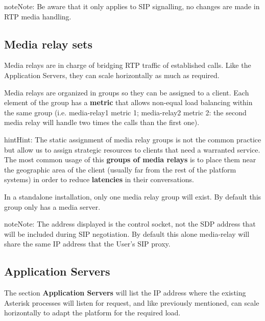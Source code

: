 \documentclass[letterpaper,10pt,english]{sphinxmanual}
\begin{document}
\begin{notice}{note}{Note:}
Be aware that it only applies to SIP signalling, no changes are made in RTP media handling.
\end{notice}


\subsection{Media relay sets}
\label{administration_portal/platform/infrastructure/media_relay_sets::doc}\label{administration_portal/platform/infrastructure/media_relay_sets:media-relay-sets}
Media relays are in charge of bridging RTP traffic of established calls. Like
the Application Servers, they can scale horizontally as much as required.

Media relays are organized in groups so they can be assigned to a client. Each
element of the group has a \textbf{metric} that allows non-equal load balancing
within the same group (i.e. media-relay1 metric 1; media-relay2 metric 2:
the second media relay will handle two times the calls than the first one).

\begin{notice}{hint}{Hint:}
The static assignment of media relay groups is not the common practice
but allow us to assign strategic resources to clients that need a warranted
service. The most common usage of this \textbf{groups of media relays} is to
place them near the geographic area of the client (usually far from the
rest of the platform systems) in order to reduce \textbf{latencies} in their
conversations.
\end{notice}

In a standalone installation, only one media relay group will exist. By default this group only has a media server.

\begin{notice}{note}{Note:}
The address displayed is the control socket, not the SDP address that
will be included during SIP negotiation. By default this alone media-relay
will share the same IP address that the User's SIP proxy.
\end{notice}


\subsection{Application Servers}
\label{administration_portal/platform/infrastructure/application_servers::doc}\label{administration_portal/platform/infrastructure/application_servers:application-servers}
The section \textbf{Application Servers} will list the IP address where the existing
Asterisk processes will listen for request, and like previously mentioned,
can scale horizontally to adapt the platform for the required load.
\end{document}
